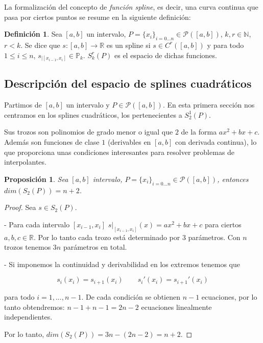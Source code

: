 \documentclass[11pt,spanish,]{article}
\newtheorem*{proposicion}{Proposición} \newtheorem*{teorema}{Teorema}
\theoremstyle{definition} \newtheorem*{definicion}{Definición}
\begin{document}
La formalización del concepto de \emph{función spline}, es decir, una
curva continua que pasa por ciertos puntos se resume en la siguiente
definición:

\begin{definicion}
Sea $[a,b]$ un intervalo, $P = \{x_i\}_{i = 0...n} \in \mathscr{P}([a,b])$,
$k,r\in \mathbb{N}$, $r < k$. Se dice que $s:[a,b] \to \mathbb{R}$ es un
spline si $s \in C^r([a,b])$ y para todo $1 \leq i \leq n$,
$s_{|[x_{i-1},x_i]} \in \mathbb{P}_k$. $S^r_k(P)$ es el espacio de dichas funciones.
\end{definicion}

\vspace*{2\baselineskip}

\subsection{Descripción del espacio de splines
cuadráticos}\label{descripciuxf3n-del-espacio-de-splines-cuadruxe1ticos}

Partimos de $[a,b]$ un intervalo y $P \in \mathscr{P}([a,b])$. En esta
primera sección nos centramos en los splines cuadráticos, los
pertenecientes a $S_2^1(P)$.

Sus trozos son polinomios de grado menor o igual que $2$ de la forma
$ax^2 + bx + c$. Además son funciones de clase $1$ (derivables en
$[a,b]$ con derivada continua), lo que proporciona unas condiciones
interesantes para resolver problemas de interpolantes.

\begin{proposicion}
Sea $[a,b]$ intervalo, $P = \{x_i\}_{i=0...n} \in \mathscr{P}([a,b])$, entonces $dim(S_2(P)) = n+2$.
\end{proposicion}

\begin{proof}

Sea $s \in S_2(P)$.

- Para cada intervalo $[x_{i-1}, x_i]$ $ s|_{[x_{i-1}, x_i]}(x) = ax^2 + bx + c$ para ciertos $a,b,c \in \mathbb{R}$. Por lo tanto cada trozo está determinado por 3 parámetros. Con $n$ trozos tenemos $3n$ parámetros en total.

\pagebreak

- Si imponemos la continuidad y derivabilidad en los extremos tenemos que

\[
s_i(x_i)=s_{i+1}(x_i) \qquad s_i'(x_i)=s_{i+1}'(x_i)
\]

para todo $i=1,...,n-1$. De cada condición se obtienen $n-1$ ecuaciones, por
lo tanto obtendremos: $n-1 + n-1 = 2n-2$ ecuaciones linealmente
independientes.

Por lo tanto, $dim(S_2(P)) = 3n-(2n-2) = n+2$.
\end{proof}
\end{document}
